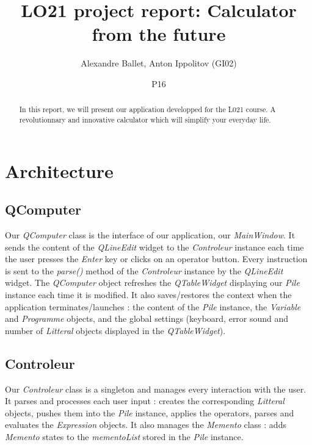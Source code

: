\documentclass[titlepage]{article}
\begin{document}
\title{LO21 project report: Calculator from the future}
\author{Alexandre Ballet, Anton Ippolitov (GI02)}
\date{P16}
\maketitle

\tableofcontents

\begin{abstract}
In this report, we will present our application developped for the L021 course. A revolutionnary and innovative calculator which will simplify your everyday life.
\end{abstract}

\section{Architecture}

\subsection{QComputer}

Our \textit{QComputer} class is the interface of our application, our \textit{MainWindow}. It sends the content of the \textit{QLineEdit} widget to the \textit{Controleur} instance each time the user presses the \textit{Enter} key or clicks on an operator button. Every instruction is sent to the \textit{parse()} method of the \textit{Controleur} instance by the \textit{QLineEdit} widget. The \textit{QComputer} object refreshes the \textit{QTableWidget} displaying our \textit{Pile} instance each time it is modified.
It also saves/restores the context when the application terminates/launches : the content of the \textit{Pile} instance, the \textit{Variable} and \textit{Programme} objects, and the global settings (keyboard, error sound and number of \textit{Litteral} objects displayed in the \textit{QTableWidget}).\\

\subsection{Controleur}

Our \textit{Controleur} class is a singleton and manages every interaction with the user. It parses and processes each user input : creates the corresponding \textit{Litteral} objects, pushes them into the \textit{Pile} instance, applies the operators, parses and evaluates the \textit{Expression} objects. It also manages the \textit{Memento} class : adds \textit{Memento} states to the \textit{mementoList} stored in the \textit{Pile} instance.\\
\end{document}

